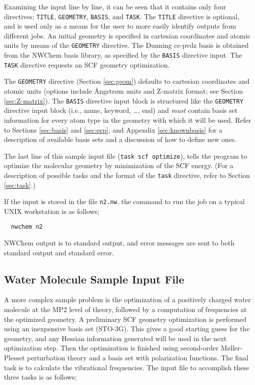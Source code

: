 Examining the input line by line, it can be seen that it contains
only four directives; \verb+TITLE+, \verb+GEOMETRY+, \verb+BASIS+, and
\verb+TASK+.  The \verb+TITLE+ directive is optional, and is used only
as a means for the user to more easily identify outputs from different
jobs.  An initial geometry is specified in cartesian coordinates and
atomic units by means of the \verb+GEOMETRY+ directive.  The Dunning 
cc-pvdz basis is obtained from the NWChem basis library, as specified
by the \verb+BASIS+ directive input.  The \verb+TASK+ directive requests 
an SCF geometry optimization.

The \verb+GEOMETRY+ directive (Section \ref{sec:geom}) defaults to cartesian
coordinates and atomic units (options include {\AA}ngstr{\o}m units and
Z-matrix format; see Section \ref{sec:Z-matrix}).  The \verb+BASIS+ 
directive input block is structured like the \verb+GEOMETRY+ directive
input block (i.e., name,
keyword, \ldots, end) and {\em must} contain basis set information for
every atom type in the geometry with which it will be used.
Refer to Sections \ref{sec:basis} and \ref{sec:ecp}, and Appendix
\ref{sec:knownbasis} for a description of available basis sets and a
discussion of how to define new ones.

The last line of this sample input file ({\tt task scf optimize}),
tells the program to optimize the molecular geometry by minimization
of the SCF energy.  (For a description of possible tasks and the format
of the {\tt task} directive, refer to Section \ref{sec:task}.)

If the input is stored in the file \verb+n2.nw+, the command to run
the job on a typical UNIX workstation is as follows;

\begin{verbatim}
  nwchem n2
\end{verbatim}

NWChem output is to standard output, and error messages are sent to
both standard output and standard error.

\subsection{Water Molecule Sample Input File}
\label{sec:realsample}

A more complex sample problem is the optimization of a positively
charged water molecule at the MP2 level of theory, followed by a computation of
frequencies at the optimized geometry.  A preliminary SCF geometry
optimization is performed using an inexpensive basis set (STO-3G).
This gives a good starting guess for the geometry, and any Hessian
information generated will be used in the next optimization step.
Then the optimization is finished using second-order M{\o}ller-Plesset
perturbation theory and a basis set with polarization functions.  The
final task is to calculate the vibrational frequencies.  The input
file to accomplish these three tasks is as follows;

